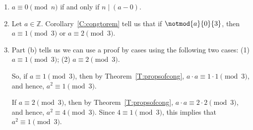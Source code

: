\begin{list}{\bf{\ref{exer:sec34-4}.}}
\item \begin{enumerate}
\item $a \equiv 0 \pmod n$ if and only if $n \mid \left( a - 0 \right)$.

\item Let  $a \in \mathbb{Z}$.  Corollary~\ref{C:congtorem} tell us that  if  $\notmod{a}{0}{3}$, then  \\
$a \equiv 1 \pmod 3$ or  $a \equiv 2 \pmod 3$.

\item Part (b) tells us we can use a proof by cases using the following two cases:  
(1) $a \equiv 1 \pmod 3$;  (2) $a \equiv 2 \pmod 3$.

So, if $a \equiv 1 \pmod 3$, then by Theorem~\ref{T:propsofcong}, 
$a \cdot a \equiv 1 \cdot 1 \pmod 3$, and hence, $a^2 \equiv 1 \pmod 3$.

If $a \equiv 2 \pmod 3$, then by Theorem~\ref{T:propsofcong}, 
$a \cdot a \equiv 2 \cdot 2 \pmod 3$, and hence, $a^2 \equiv 4 \pmod 3$.  Since 
$4 \equiv 1 \pmod 3$, this implies that $a^2 \equiv 1 \pmod 3$.
\end{enumerate}

\end{list}



